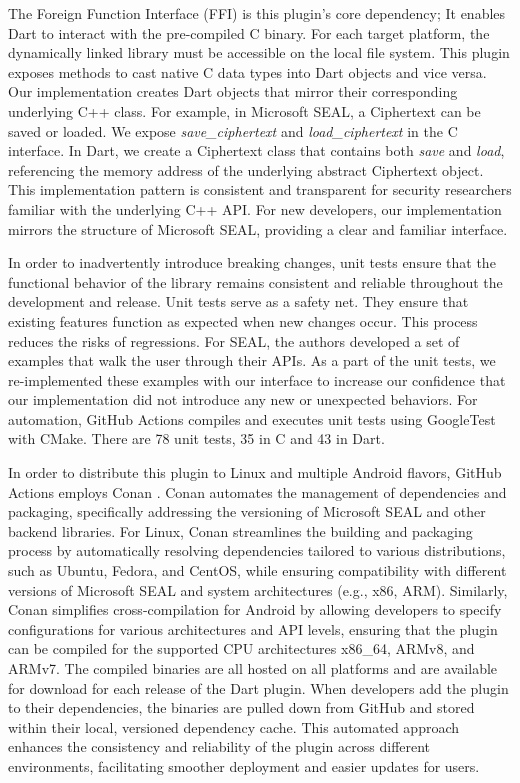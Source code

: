 The Foreign Function Interface (FFI) is this plugin's core dependency; It enables Dart to interact with the pre-compiled C binary. For each target platform, the dynamically linked library must be accessible on the local file system. This plugin exposes methods to cast native C data types into Dart objects and vice versa. Our implementation creates Dart objects that mirror their corresponding underlying C++ class. For example, in Microsoft SEAL, a Ciphertext can be saved or loaded. We expose \textit{save\_ciphertext} and \textit{load\_ciphertext} in the C interface. In Dart, we create a Ciphertext class that contains both \textit{save} and \textit{load}, referencing the memory address of the underlying abstract Ciphertext object. This implementation pattern is consistent and transparent for security researchers familiar with the underlying C++ API. For new developers, our implementation mirrors the structure of Microsoft SEAL, providing a clear and familiar interface.

In order to inadvertently introduce breaking changes, unit tests ensure that the functional behavior of the library remains consistent and reliable throughout the development and release. Unit tests serve as a safety net. They ensure that existing features function as expected when new changes occur. This process reduces the risks of regressions. For SEAL, the authors developed a set of examples that walk the user through their APIs. As a part of the unit tests, we re-implemented these examples with our interface to increase our confidence that our implementation did not introduce any new or unexpected behaviors. For automation, GitHub Actions compiles and executes unit tests using GoogleTest \cite{GoogleTest} with CMake. There are 78 unit tests, 35 in C and 43 in Dart.

In order to distribute this plugin to Linux and multiple Android flavors, GitHub Actions employs Conan \cite{Conan}. Conan automates the management of dependencies and packaging, specifically addressing the versioning of Microsoft SEAL and other backend libraries. For Linux, Conan streamlines the building and packaging process by automatically resolving dependencies tailored to various distributions, such as Ubuntu, Fedora, and CentOS, while ensuring compatibility with different versions of Microsoft SEAL and system architectures (e.g., x86, ARM). Similarly, Conan simplifies cross-compilation for Android by allowing developers to specify configurations for various architectures and API levels, ensuring that the plugin can be compiled for the supported CPU architectures x86\_64, ARMv8, and ARMv7. The compiled binaries are all hosted on all platforms and are available for download for each release of the Dart plugin. When developers add the plugin to their dependencies, the binaries are pulled down from GitHub and stored within their local, versioned dependency cache. This automated approach enhances the consistency and reliability of the plugin across different environments, facilitating smoother deployment and easier updates for users.